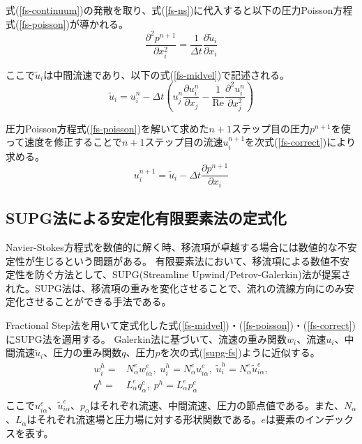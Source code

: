 \documentclass[8pt,a4paper]{article}
\begin{document}
式(\ref{fs-continuum})の発散を取り、式(\ref{fs-ns})に代入すると以下の圧力Poisson方程式(\ref{fs-poisson})が導かれる。
\begin{equation}
\label{fs-poisson}
	\frac{\partial^2 p^{n+1}}{\partial x^{2}_i} = \frac{1}{\Delta t} \frac{\partial \tilde{u}_i}{\partial x_{i}}
\end{equation}

ここで$\tilde{u}_{i}$は中間流速であり、以下の式(\ref{fs-midvel})で記述される。
\begin{equation}
\label{fs-midvel}
	\tilde{u}_{i} = u_{i}^{n} - \Delta t
	\left(u_{j}^{n} \frac{\partial u_{i}^{n}}{\partial x_{j}} 
	- \frac{1}{\mathrm{Re}} \frac{\partial^{2} u_{i}^{n}}{\partial x_{j}^{2}}\right)
\end{equation}

圧力Poisson方程式(\ref{fs-poisson})を解いて求めた$n+1$ステップ目の圧力$p^{n+1}$を使って速度を修正することで$n+1$ステップ目の流速$u^{n+1}_{i}$を次式(\ref{fs-correct})により求める。
\begin{equation}
\label{fs-correct}
	u^{n+1}_i=\tilde{u}_i - \Delta t \frac{\partial p^{n+1}}{\partial x_i}
\end{equation}

\subsection{SUPG法による安定化有限要素法の定式化}
Navier-Stokes方程式を数値的に解く時、移流項が卓越する場合には数値的な不安定性が生じるという問題がある。
有限要素法において、移流項による数値不安定性を防ぐ方法として、SUPG(Streamline Upwind/Petrov-Galerkin)法が提案された。SUPG法は、移流項の重みを変化させることで、流れの流線方向にのみ安定化させることができる手法である。

Fractional Step法を用いて定式化した式(\ref{fs-midvel})・(\ref{fs-poisson})・(\ref{fs-correct})にSUPG法を適用する。
Galerkin法に基づいて、流速の重み関数$w_{i}$、流速$u_{i}$、中間流速$\tilde{u}_{i}$、圧力の重み関数$q$、圧力$p$を次の式(\ref{supg-fs})ように近似する。
\begin{equation}
\label{supg-fs}
	\begin{split}
		w_{i}^{h}=&N_{\alpha}^{e} w_{i\alpha}^{e},\; u_{i}^{h}=N_{\alpha}^{e} u_{i\alpha}^{e},\; 
		\tilde{u}_{i}^{h}=N_{\alpha}^{e} \tilde{u}_{i\alpha}^{e}, \\
		q^{h}=&L_{\alpha}^{e} q_{\alpha}^{e}, \; p^{h}=L_{\alpha}^{e} p_{\alpha}^{e} \\
	\end{split}
\end{equation}
ここで$u_{i\alpha}^{e}$、$\tilde{u}_{i\alpha}^{e}$、$p_{\alpha}$はそれぞれ流速、中間流速、圧力の節点値である。また、$N_{\alpha}$、$L_{\alpha}$はそれぞれ流速場と圧力場に対する形状関数である。$e$は要素のインデックスを表す。
\end{document}
